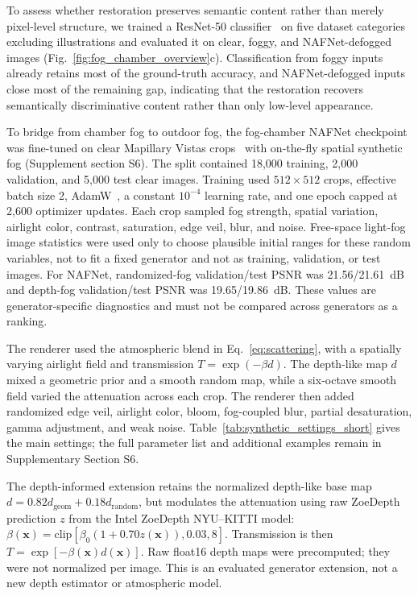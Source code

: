 \documentclass{optica-article}
\begin{document}
To assess whether restoration preserves semantic content rather than
merely pixel-level structure, we trained a ResNet-50
classifier~\cite{he2016deep} on five dataset categories excluding illustrations and
evaluated it on clear, foggy, and NAFNet-defogged images
(Fig.~\ref{fig:fog_chamber_overview}c). Classification from foggy
inputs already retains most of the ground-truth accuracy, and
NAFNet-defogged inputs close most of the remaining gap, indicating
that the restoration recovers semantically discriminative content
rather than only low-level appearance.

To bridge from chamber fog to outdoor fog, the fog-chamber NAFNet
checkpoint was fine-tuned on clear Mapillary Vistas
crops~\cite{neuhold2017mapillary} with on-the-fly spatial synthetic
fog (Supplement section S6). The split contained 18{,}000 training,
2{,}000 validation, and 5{,}000 test clear images. Training used
$512\times512$ crops, effective batch size 2,
AdamW~\cite{loshchilov2019adamw}, a constant $10^{-4}$ learning
rate, and one epoch capped at 2{,}600 optimizer updates. Each crop sampled fog strength, spatial
variation, airlight color, contrast, saturation, edge veil, blur,
and noise. Free-space light-fog image statistics were used only to
choose plausible initial ranges for these random variables, not to
fit a fixed generator and not as training, validation, or test
images. For NAFNet, randomized-fog validation/test PSNR was
21.56/21.61~dB and depth-fog validation/test PSNR was
19.65/19.86~dB. These values are generator-specific diagnostics and
must not be compared across generators as a ranking.

The renderer used the atmospheric blend in Eq.~\ref{eq:scattering}, with
a spatially varying airlight field and transmission
$T=\exp(-\beta d)$. The depth-like map $d$ mixed a geometric prior and a
smooth random map, while a six-octave smooth field varied the attenuation
across each crop. The renderer then added randomized edge veil, airlight
color, bloom, fog-coupled blur, partial desaturation, gamma adjustment,
and weak noise. Table~\ref{tab:synthetic_settings_short} gives the main
settings; the full parameter list and additional examples remain in
Supplementary Section S6.

The depth-informed extension retains the normalized depth-like base map
$d=0.82d_{\mathrm{geom}}+0.18d_{\mathrm{random}}$, but modulates the
attenuation using raw ZoeDepth prediction $z$ from the
Intel ZoeDepth NYU--KITTI model:
$\beta(\mathbf{x})=\mathrm{clip}[\beta_0(1+0.70z(\mathbf{x})),0.03,8]$.
Transmission is then $T=\exp[-\beta(\mathbf{x})d(\mathbf{x})]$. Raw
float16 depth maps were precomputed; they were not normalized per image.
This is an evaluated generator extension, not a new depth estimator or
atmospheric model.
\end{document}
